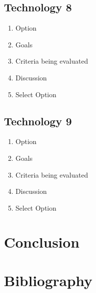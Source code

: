 \documentclass[letterpaper, 10pt, draftclsnofoot, compsoc, onecolumn]{IEEEtran}
\begin{document}
	\subsection{Technology 8}
		\begin{enumerate}
			\item{Option}
			\item{Goals}
			\item{Criteria being evaluated}
			\item{Discussion}
			\item{Select Option}
		\end{enumerate}
	\subsection{Technology 9}
		\begin{enumerate}
			\item{Option}
			\item{Goals}
			\item{Criteria being evaluated}
			\item{Discussion}
			\item{Select Option}
		\end{enumerate}
\section{Conclusion}

\section{Bibliography}
\end{document}
